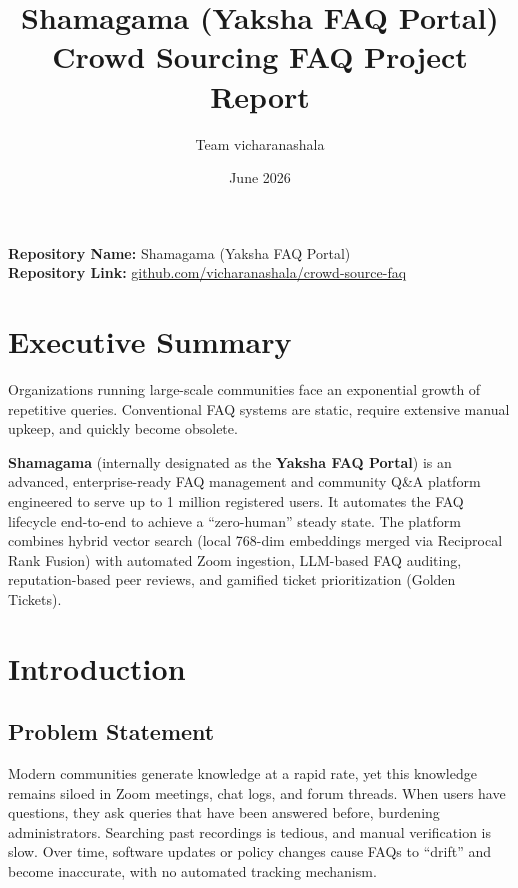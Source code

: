 \documentclass[11pt,a4paper]{article}
\title{Shamagama (Yaksha FAQ Portal)\\ \large Crowd Sourcing FAQ Project Report}
\author{Team vicharanashala}
\date{June 2026}
\begin{document}
\maketitle

\begin{center}
    \textbf{Repository Name:} Shamagama (Yaksha FAQ Portal) \\
    \textbf{Repository Link:} \href{https://github.com/vicharanashala/crowd-source-faq}{github.com/vicharanashala/crowd-source-faq}
\end{center}

\newpage
\tableofcontents
\newpage

\section{Executive Summary}
Organizations running large-scale communities face an exponential growth of repetitive queries. Conventional FAQ systems are static, require extensive manual upkeep, and quickly become obsolete. 

\textbf{Shamagama} (internally designated as the \textbf{Yaksha FAQ Portal}) is an advanced, enterprise-ready FAQ management and community Q\&A platform engineered to serve up to 1 million registered users. It automates the FAQ lifecycle end-to-end to achieve a ``zero-human'' steady state. The platform combines hybrid vector search (local 768-dim embeddings merged via Reciprocal Rank Fusion) with automated Zoom ingestion, LLM-based FAQ auditing, reputation-based peer reviews, and gamified ticket prioritization (Golden Tickets).

\section{Introduction}
\subsection{Problem Statement}
Modern communities generate knowledge at a rapid rate, yet this knowledge remains siloed in Zoom meetings, chat logs, and forum threads. When users have questions, they ask queries that have been answered before, burdening administrators. Searching past recordings is tedious, and manual verification is slow. Over time, software updates or policy changes cause FAQs to ``drift'' and become inaccurate, with no automated tracking mechanism.
\end{document}

